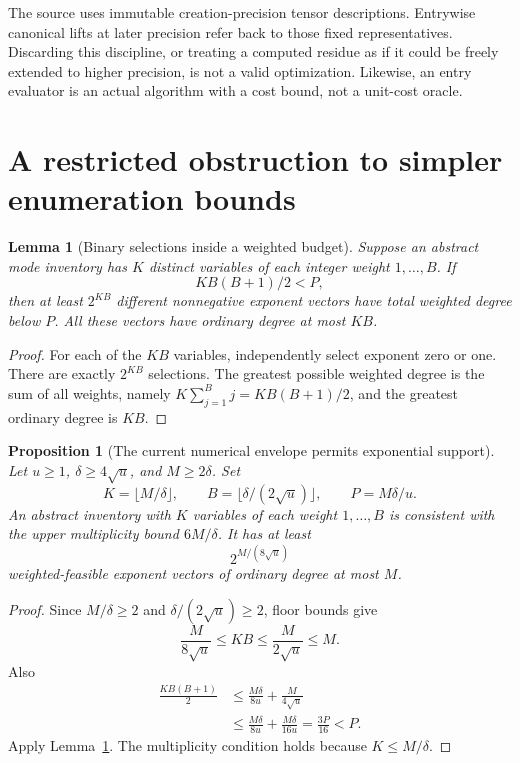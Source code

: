 \documentclass[11pt,letterpaper]{article}
\newtheorem{proposition}{Proposition}
\newtheorem{lemma}{Lemma}
\theoremstyle{remark}\newtheorem*{scope}{Scope}
\begin{document}
The source uses immutable creation-precision tensor descriptions. Entrywise canonical lifts at later precision refer back to those fixed representatives. Discarding this discipline, or treating a computed residue as if it could be freely extended to higher precision, is not a valid optimization. Likewise, an entry evaluator is an actual algorithm with a cost bound, not a unit-cost oracle.

\section{A restricted obstruction to simpler enumeration bounds}
\begin{lemma}[Binary selections inside a weighted budget]\label{lem:binary}
Suppose an abstract mode inventory has $K$ distinct variables of each integer weight $1,\ldots,B$. If
\[
 K B(B+1)/2<P,
\]
then at least $2^{KB}$ different nonnegative exponent vectors have total weighted degree below $P$. All these vectors have ordinary degree at most $KB$.
\end{lemma}
\begin{proof}
For each of the $KB$ variables, independently select exponent zero or one. There are exactly $2^{KB}$ selections. The greatest possible weighted degree is the sum of all weights, namely $K\sum_{j=1}^B j=KB(B+1)/2$, and the greatest ordinary degree is $KB$.
\end{proof}

\begin{proposition}[The current numerical envelope permits exponential support]\label{prop:envelope}
Let $u\ge1$, $\delta\ge4\sqrt u$, and $M\ge2\delta$. Set
\[
 K=\lfloor M/\delta\rfloor,\qquad
 B=\lfloor\delta/(2\sqrt u)\rfloor,\qquad
 P=M\delta/u.
\]
An abstract inventory with $K$ variables of each weight $1,\ldots,B$ is consistent with the upper multiplicity bound $6M/\delta$. It has at least
\[
 2^{M/(8\sqrt u)}
\]
weighted-feasible exponent vectors of ordinary degree at most $M$.
\end{proposition}
\begin{proof}
Since $M/\delta\ge2$ and $\delta/(2\sqrt u)\ge2$, floor bounds give
\[
 \frac{M}{8\sqrt u}\le KB\le\frac{M}{2\sqrt u}\le M.
\]
Also
\begin{align*}
 \frac{KB(B+1)}2
 &\le \frac{M\delta}{8u}+\frac{M}{4\sqrt u}\\
 &\le\frac{M\delta}{8u}+\frac{M\delta}{16u}
 =\frac{3P}{16}<P.
\end{align*}
Apply Lemma~\ref{lem:binary}. The multiplicity condition holds because $K\le M/\delta$.
\end{proof}
\end{document}

